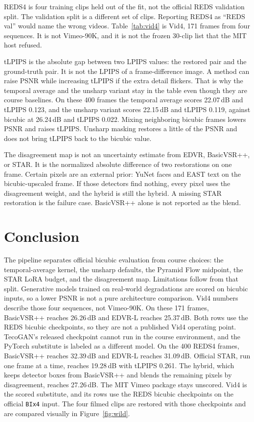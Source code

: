 \documentclass[10pt,twocolumn,letterpaper]{article}
\begin{document}
REDS4 is four training clips held out of the fit, not the official REDS validation split.
The validation split is a different set of clips.
Reporting REDS4 as ``REDS val'' would name the wrong videos.
Table~\ref{tab:vid4} is Vid4, 171 frames from four sequences.
It is not Vimeo-90K, and it is not the frozen 30-clip list that the MIT host refused.

tLPIPS is the absolute gap between two LPIPS values: the restored pair and the ground-truth pair.
It is not the LPIPS of a frame-difference image.
A method can raise PSNR while increasing tLPIPS if the extra detail flickers.
That is why the temporal average and the unsharp variant stay in the table even though they are course baselines.
On these 400 frames the temporal average scores 22.07\,dB and tLPIPS 0.123, and the unsharp variant scores 22.15\,dB and tLPIPS 0.119, against bicubic at 26.24\,dB and tLPIPS 0.022.
Mixing neighboring bicubic frames lowers PSNR and raises tLPIPS.
Unsharp masking restores a little of the PSNR and does not bring tLPIPS back to the bicubic value.

The disagreement map is not an uncertainty estimate from EDVR, BasicVSR++, or STAR.
It is the normalized absolute difference of two restorations on one frame.
Certain pixels are an external prior: YuNet faces and EAST text on the bicubic-upscaled frame.
If those detectors find nothing, every pixel uses the disagreement weight, and the hybrid is still the hybrid.
A missing STAR restoration is the failure case.
BasicVSR++ alone is not reported as the blend.

\section{Conclusion}
The pipeline separates official bicubic evaluation from course choices: the temporal-average kernel, the unsharp defaults, the Pyramid Flow midpoint, the STAR LoRA budget, and the disagreement map.
Limitations follow from that split.
Generative models trained on real-world degradations are scored on bicubic inputs, so a lower PSNR is not a pure architecture comparison.
Vid4 numbers describe those four sequences, not Vimeo-90K.
On these 171 frames, BasicVSR++ reaches 26.26\,dB and EDVR-L reaches 25.37\,dB.
Both rows use the REDS bicubic checkpoints, so they are not a published Vid4 operating point.
TecoGAN's released checkpoint cannot run in the course environment, and the PyTorch substitute is labeled as a different model.
On the 400 REDS4 frames, BasicVSR++ reaches 32.39\,dB and EDVR-L reaches 31.09\,dB.
Official STAR, run one frame at a time, reaches 19.28\,dB with tLPIPS 0.261.
The hybrid, which keeps detector boxes from BasicVSR++ and blends the remaining pixels by disagreement, reaches 27.26\,dB.
The MIT Vimeo package stays unscored. Vid4 is the scored substitute, and its rows use the REDS bicubic checkpoints on the official \texttt{BIx4} input.
The four filmed clips are restored with those checkpoints and are compared visually in Figure~\ref{fig:wild}.

{
\small


}
\end{document}
